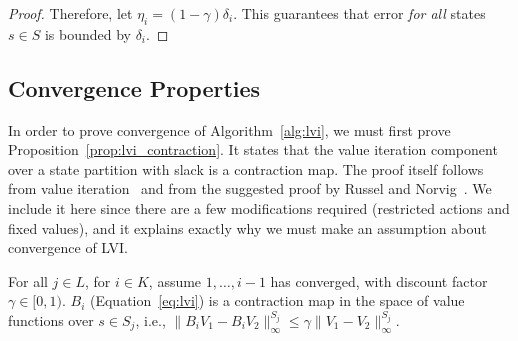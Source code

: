\begin{proof}
Therefore, let $\eta_i = (1 - \gamma) \delta_i$. This guarantees that error \emph{for all} states $s \in S$ is bounded by $\delta_i$.
\end{proof}


\subsection{Convergence Properties}

In order to prove convergence of Algorithm~\ref{alg:lvi}, we must first prove Proposition~\ref{prop:lvi_contraction}. It states that the value iteration component over a state partition with slack is a contraction map. The proof itself follows from value iteration~\cite{Bellman57} and from the suggested proof by Russel and Norvig~. We include it here since there are a few modifications required (restricted actions and fixed values), and it explains exactly why we must make an assumption about convergence of LVI.


\begin{proposition}
    \label{prop:lvi_contraction}
    For all $j \in L$, for $i \in K$, assume $1, \ldots, i - 1$ has converged, with discount factor $\gamma \in [0, 1)$. $B_i$ (Equation~\ref{eq:lvi}) is a contraction map in the space of value functions over $s \in S_j$, i.e., $\| B_i V_1 - B_i V_2 \|_\infty^{S_j} \leq \gamma \| V_1 - V_2 \|_\infty^{S_j}$.
\end{proposition}

